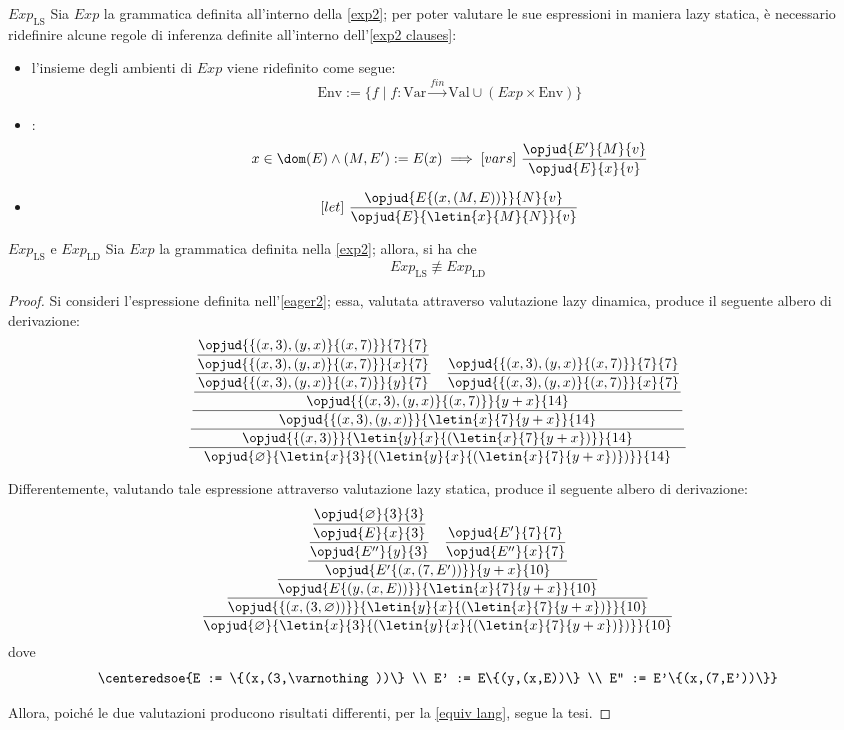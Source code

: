 \documentclass[a4paper, 12pt]{report}
\begin{document}
    \begin{framedprop}[label={exp ls}, breakable]{$Exp_\mathrm{LS}$}
        Sia $Exp$ la grammatica definita all'interno della \cref{exp2}; per poter valutare le sue espressioni in maniera lazy statica, è necessario ridefinire alcune regole di inferenza definite all'interno dell'\cref{exp2 clauses}:

        \begin{itemize}
            \item l'insieme degli ambienti di $Exp$ viene ridefinito come segue: $$\mathrm{Env} := \{f \mid f: \mathrm{Var} \xrightarrow{fin} \mathrm{Val} \cup (Exp \times \mathrm{Env}) \}$$
            \item {}: $$x \in \dom(E) \land (M, E') := E(x) \implies [vars] \ \dfrac{\opjud{E'}{M}{v}}{\opjud{E}{x}{v}}$$
            \item {} $$[let] \ \dfrac{\opjud{E\{(x, (M, E))\}}{N}{v}}{\opjud{E}{\letin{x}{M}{N}}{v}}$$
        \end{itemize}
    \end{framedprop}

    \begin{framedlem}{$Exp_\mathrm{LS}$ e $Exp_\mathrm{LD}$}
        Sia $Exp$ la grammatica definita nella \cref{exp2}; allora, si ha che $$Exp_\mathrm{LS} \not\equiv Exp_\mathrm{LD}$$
    \end{framedlem}

    \begin{proof}
        Si consideri l'espressione definita nell'\cref{eager2}; essa, valutata attraverso valutazione lazy dinamica, produce il seguente albero di derivazione: $$\dfrac{\dfrac{\dfrac{\dfrac{\dfrac{\dfrac{\opjud{\{(x,3),(y,x)\}\{(x,7)\}}{7}{7}}{\opjud{\{(x,3),(y,x)\}\{(x,7)\}}{x}{7}}}{\opjud{\{(x,3),(y,x)\}\{(x,7)\}}{y}{7}} \quad \dfrac{\opjud{\{(x,3),(y,x)\}\{(x,7)\}}{7}{7}}{\opjud{\{(x,3),(y,x)\}\{(x,7)\}}{x}{7}}}{\opjud{\{(x,3),(y,x)\}\{(x,7)\}}{y+x}{14}}}{\opjud{\{(x,3),(y,x)\}}{\letin{x}{7}{y+x}}{14}}}{\opjud{\{(x,3)\}}{\letin{y}{x}{(\letin{x}{7}{y+x})}}{14}}}{\opjud{\varnothing}{\letin{x}{3}{(\letin{y}{x}{(\letin{x}{7}{y+x})})}}{14}}$$

        Differentemente, valutando tale espressione attraverso valutazione lazy statica, produce il seguente albero di derivazione: $$\dfrac{\dfrac{\dfrac{\dfrac{\dfrac{\dfrac{\opjud{\varnothing}{3}{3}}{\opjud{E}{x}{3}}}{\opjud{E''}{y}{3}} \quad \dfrac{\opjud{E'}{7}{7}}{\opjud{E''}{x}{7}}}{\opjud{E'\{(x,(7,E'))\}}{y+x}{10}}}{\opjud{E\{(y,(x, E))\}}{\letin{x}{7}{y+x}}{10}}}{\opjud{\{(x,(3,\varnothing))\}}{\letin{y}{x}{(\letin{x}{7}{y+x})}}{10}}}{\opjud{\varnothing}{\letin{x}{3}{(\letin{y}{x}{(\letin{x}{7}{y+x})})}}{10}}$$ dove $$\centeredsoe{E := \{(x,(3,\varnothing))\} \\ E' := E\{(y,(x,E))\} \\ E'' := E'\{(x,(7,E'))\}}$$

        Allora, poiché le due valutazioni producono risultati differenti, per la \cref{equiv lang}, segue la tesi.
    \end{proof}
\end{document}
